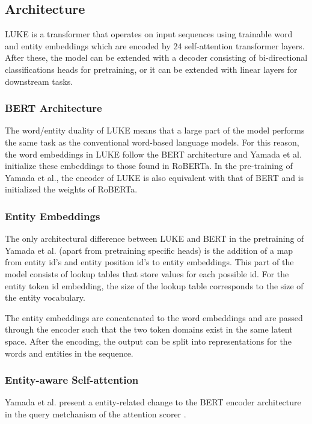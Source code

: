 \documentclass[main.tex]{subfiles}
\begin{document}
\subsection{Architecture}
LUKE is a transformer that operates on input sequences using trainable word and entity embeddings which are encoded by 24 self-attention transformer layers.
After these, the model can be extended with a decoder consisting of bi-directional classifications heads for pretraining, or it can be extended with linear layers for downstream tasks.

\subsubsection{BERT Architecture}
The word/entity duality of LUKE means that a large part of the model performs the same task as the conventional word-based language models.
For this reason, the word embeddings in LUKE follow the BERT architecture and Yamada et al. initialize these embeddings to those found in RoBERTa.
In the pre-training of Yamada et al., the encoder of LUKE is also equivalent with that of BERT and is initialized the weights of RoBERTa.

\subsubsection{Entity Embeddings}
The only architectural difference between LUKE and BERT in the pretraining of Yamada et al. (apart from pretraining specific heads) is the addition of a map from entity id's and entity position id's to entity embeddings.
This part of the model consists of lookup tables that store values for each possible id.
For the entity token id embedding, the size of the lookup table corresponds to the size of the entity vocabulary.

The entity embeddings are concatenated to the word embeddings and are passed through the encoder such that the two token domains exist in the same latent space.
After the encoding, the output can be split into representations for the words and entities in the sequence.

\subsubsection{Entity-aware Self-attention}
\label{subsubsec:entityaware}
Yamada et al. present a entity-related change to the BERT encoder architecture in the query metchanism of the attention scorer \cite[Sec. 3.2]{yamada2020luke}.
\end{document}
